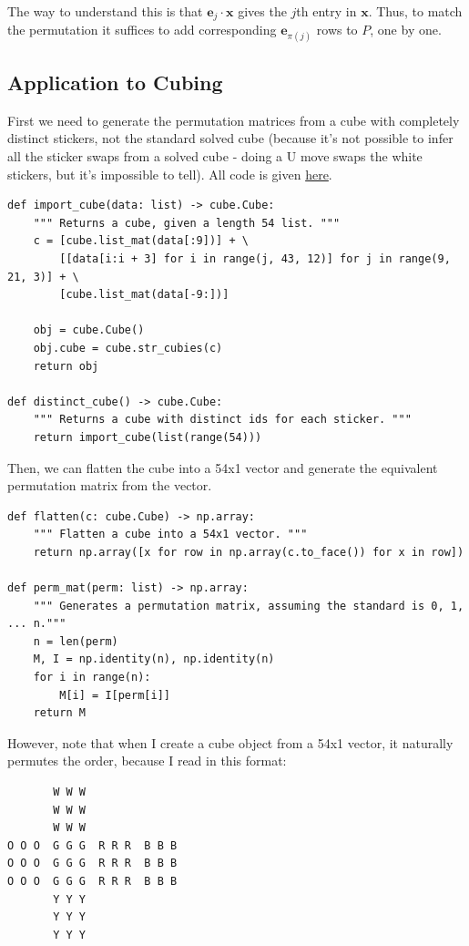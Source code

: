 \documentclass[11pt, oneside]{article}
\newcommand{\ve}[1]{\mathbf{#1}}
\theoremstyle{plain}
\begin{document}
The way to understand this is that \( \ve{e}_j \cdot \ve{x} \) gives the \(
j \)th entry in \( \ve{x} \). Thus, to match the permutation it suffices
to add corresponding \( \ve{e}_{\pi(j)} \) rows to \( P \), one by one.

\subsection{Application to Cubing}

First we need to generate the permutation matrices from a cube with
completely distinct stickers, not the standard solved cube (because it's not
possible to infer all the sticker swaps from a solved cube - doing a U move
swaps the white stickers, but it's impossible to tell). All code is given
\href{https://github.com/stephen-huan/Cube-Solver/blob/master/linear.py}{here}.

\begin{verbatim}
def import_cube(data: list) -> cube.Cube:
    """ Returns a cube, given a length 54 list. """
    c = [cube.list_mat(data[:9])] + \
        [[data[i:i + 3] for i in range(j, 43, 12)] for j in range(9, 21, 3)] + \
        [cube.list_mat(data[-9:])]

    obj = cube.Cube()
    obj.cube = cube.str_cubies(c)
    return obj

def distinct_cube() -> cube.Cube:
    """ Returns a cube with distinct ids for each sticker. """
    return import_cube(list(range(54)))
\end{verbatim}

Then, we can flatten the cube into a 54x1 vector and
generate the equivalent permutation matrix from the vector.

\begin{verbatim}
def flatten(c: cube.Cube) -> np.array:
    """ Flatten a cube into a 54x1 vector. """
    return np.array([x for row in np.array(c.to_face()) for x in row])

def perm_mat(perm: list) -> np.array:
    """ Generates a permutation matrix, assuming the standard is 0, 1, ... n."""
    n = len(perm)
    M, I = np.identity(n), np.identity(n)
    for i in range(n):
        M[i] = I[perm[i]]
    return M
\end{verbatim}

However, note that when I create a cube object from a 54x1 vector,
it naturally permutes the order, because I read in this format:
\begin{verbatim}
       W W W
       W W W
       W W W
O O O  G G G  R R R  B B B
O O O  G G G  R R R  B B B
O O O  G G G  R R R  B B B
       Y Y Y
       Y Y Y
       Y Y Y
\end{verbatim}
\end{document}
